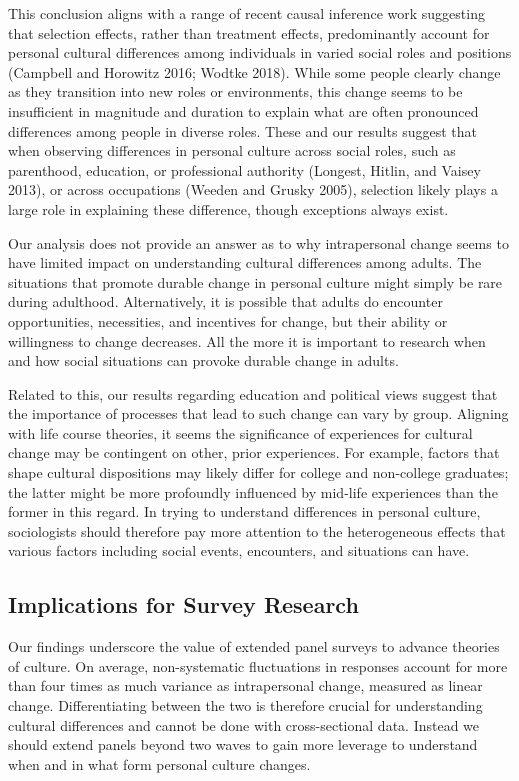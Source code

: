 \documentclass[
  12pt,
]{article}
\begin{document}
This conclusion aligns with a range of recent causal inference work
suggesting that selection effects, rather than treatment effects,
predominantly account for personal cultural differences among
individuals in varied social roles and positions (Campbell and Horowitz
2016; Wodtke 2018). While some people clearly change as they transition
into new roles or environments, this change seems to be insufficient in
magnitude and duration to explain what are often pronounced differences
among people in diverse roles. These and our results suggest that when
observing differences in personal culture across social roles, such as
parenthood, education, or professional authority (Longest, Hitlin, and
Vaisey 2013), or across occupations (Weeden and Grusky 2005), selection
likely plays a large role in explaining these difference, though
exceptions always exist.

Our analysis does not provide an answer as to why intrapersonal change
seems to have limited impact on understanding cultural differences among
adults. The situations that promote durable change in personal culture
might simply be rare during adulthood. Alternatively, it is possible
that adults do encounter opportunities, necessities, and incentives for
change, but their ability or willingness to change decreases. All the
more it is important to research when and how social situations can
provoke durable change in adults.

Related to this, our results regarding education and political views
suggest that the importance of processes that lead to such change can
vary by group. Aligning with life course theories, it seems the
significance of experiences for cultural change may be contingent on
other, prior experiences. For example, factors that shape cultural
dispositions may likely differ for college and non-college graduates;
the latter might be more profoundly influenced by mid-life experiences
than the former in this regard. In trying to understand differences in
personal culture, sociologists should therefore pay more attention to
the heterogeneous effects that various factors including social events,
encounters, and situations can have.

\hypertarget{implications-for-survey-research}{%
\subsection{Implications for Survey
Research}\label{implications-for-survey-research}}

Our findings underscore the value of extended panel surveys to advance
theories of culture. On average, non-systematic fluctuations in
responses account for more than four times as much variance as
intrapersonal change, measured as linear change. Differentiating between
the two is therefore crucial for understanding cultural differences and
cannot be done with cross-sectional data. Instead we should extend
panels beyond two waves to gain more leverage to understand when and in
what form personal culture changes.
\end{document}

